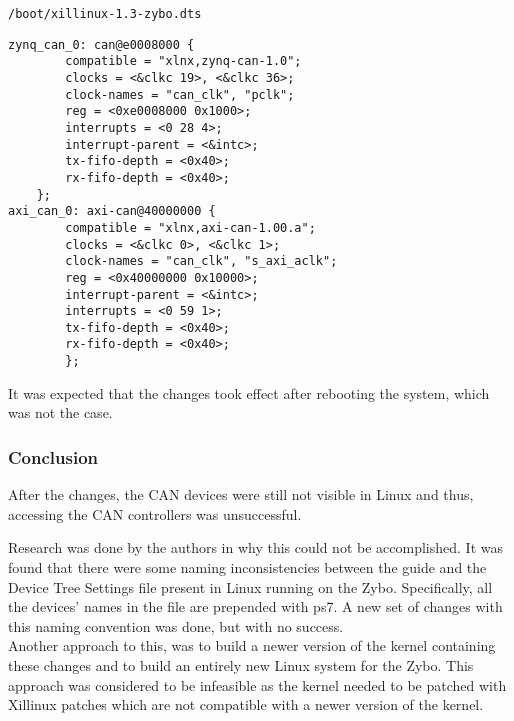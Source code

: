 \begin{lstlisting}[numbers=none,caption={Device tree settings file and its path.},label={code:dts_file_zybo}]
/boot/xillinux-1.3-zybo.dts
\end{lstlisting}
\begin{lstlisting}[caption={Device tree settings changes.},label={code:dts_changes_zybo}]
zynq_can_0: can@e0008000 {
        compatible = "xlnx,zynq-can-1.0";
        clocks = <&clkc 19>, <&clkc 36>;
        clock-names = "can_clk", "pclk";
        reg = <0xe0008000 0x1000>;
        interrupts = <0 28 4>;
        interrupt-parent = <&intc>;
        tx-fifo-depth = <0x40>;
        rx-fifo-depth = <0x40>;
    };
axi_can_0: axi-can@40000000 {
        compatible = "xlnx,axi-can-1.00.a";
        clocks = <&clkc 0>, <&clkc 1>;
        clock-names = "can_clk", "s_axi_aclk";
        reg = <0x40000000 0x10000>;
        interrupt-parent = <&intc>;
        interrupts = <0 59 1>;
        tx-fifo-depth = <0x40>;
        rx-fifo-depth = <0x40>;
        };
\end{lstlisting}
It was expected that the changes took effect after rebooting the system, which was not the case.

\subsubsection*{Conclusion}
After the changes, the CAN devices were still not visible in Linux and thus, accessing the CAN controllers was unsuccessful.

Research was done by the authors in why this could not be accomplished.
It was found that there were some naming inconsistencies between the guide and the Device Tree Settings file present in Linux running on the Zybo. Specifically, all the devices' names in the file are prepended with ps7.
A new set of changes with this naming convention was done, but with no success.\\

Another approach to this, was to build a newer version of the kernel containing these changes and to build an entirely new Linux system for the Zybo.
This approach was considered to be infeasible as the kernel needed to be patched with Xillinux patches which are not compatible with a newer version of the kernel.

